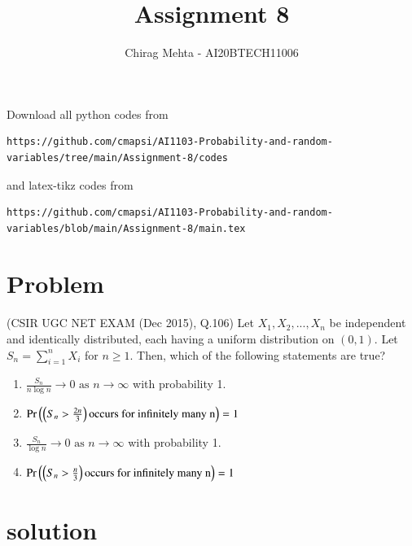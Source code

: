 \documentclass[journal,12pt,twocolumn]{IEEEtran}
\begin{document}
\vspace{3cm}
\title{Assignment 8}
\author{Chirag Mehta - AI20BTECH11006}
\maketitle
\newpage
\bigskip
\renewcommand{\thefigure}{\theenumi}
\renewcommand{\thetable}{\theenumi}
Download all python codes from 
\begin{lstlisting}
https://github.com/cmapsi/AI1103-Probability-and-random-variables/tree/main/Assignment-8/codes
\end{lstlisting}
and latex-tikz codes from 
\begin{lstlisting}
https://github.com/cmapsi/AI1103-Probability-and-random-variables/blob/main/Assignment-8/main.tex
\end{lstlisting}
\section{Problem}
(CSIR UGC NET EXAM (Dec 2015), Q.106) Let $X_1,X_2,...,X_n$ be independent and identically distributed, each having a uniform distribution on $(0,1)$. Let $S_n=\sum_{i=1}^{n}X_i$ for $n\ge 1$. Then, which of the following statements are true? 
\begin{enumerate}[label=\Alph*)]
\item $\frac{S_n}{n \log{n}}\to 0 \text{ as } n \to \infty$ with probability 1.
\item $\Pr\left(\left(S_n>\frac{2n}{3}\right)\text{occurs for infinitely many n}\right)=1$
\item $\frac{S_n}{\log{n}}\to 0\text{ as } n \to \infty$ with probability 1.
\item $\Pr\left(\left(S_n>\frac{n}{3}\right)\text{occurs for infinitely many n}\right)=1$
\end{enumerate}
\section{solution}

\begin{table}[htp]
\centering
\caption{Variables and their definitions}
\label{table1}
\end{table}
\end{document}
